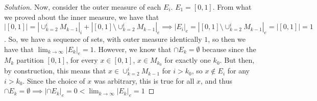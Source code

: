 \documentclass[10pt]{article}
\begin{document}
\begin{proof}[Solution]
Now, consider the outer measure of each $E_i$. $E_1 = [0,1]$. From what we proved about the inner measure, we have that $|[0,1]| = |\cup_{k=2}^i M_{k-1}|_i + |[0,1] \setminus\cup_{k=2}^i M_{k-1}|_e \implies  |E_i|_e = |[0,1] \setminus\cup_{k=2}^i M_{k-1}|_e = |[0,1]| = 1$. So, we have a sequence of sets, with outer measure identically $1$, so then we have that $\lim_{k \to \infty} |E_k|_e = 1$. However, we know that $\cap E_k = \emptyset$ because since the $M_k$ partition $[0,1]$, for every $x \in [0,1]$, $x \in M_{k_0}$ for exactly one $k_0$. But then, by construction, this means that $x \in \cup_{k=2}^i M_{k-1}$ for $i > k_0$, so $x \not \in E_i$ for any $i > k_0$. Since the choice of $x$ was arbitrary, this is true for all $x$, and thus  $\cap E_k = \emptyset \implies |\cap E_k|_e = 0 < \lim_{k \to \infty} |E_k|_e = 1$
\end{proof}
\end{document}

